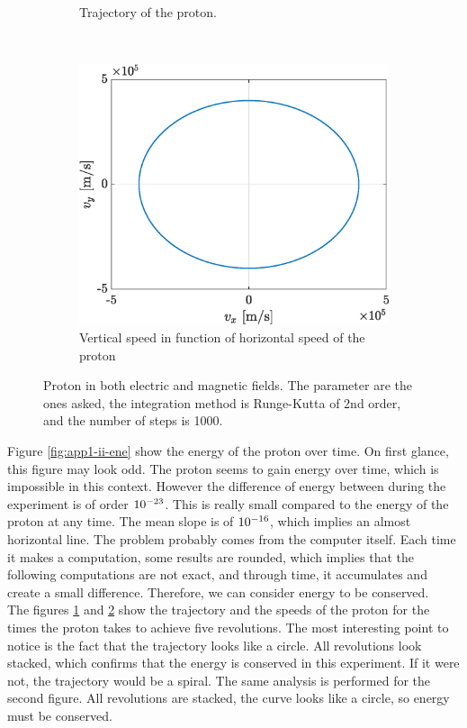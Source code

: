 \documentclass[a4paper,12pt,twoside]{article}
\begin{document}
\begin{figure}[h]
\begin{subfigure}[t]{0.32\textwidth}
	\caption{Trajectory of the proton.}
	\label{fig:app1-ii-traj}
\end{subfigure}
~
\begin{subfigure}[t]{0.32\textwidth}
	\includegraphics[width=\textwidth]{graphs/app1_ii_vit.eps}
	\caption{Vertical speed in function of horizontal speed of the proton}
	\label{fig:app1-ii-vit}
\end{subfigure}
\caption{Proton in both electric and magnetic fields. The parameter are the ones asked, the integration method is Runge-Kutta of 2nd order, and the number of steps is \SI{1000}{}.}
\label{fig:app1_ii}
\end{figure}

Figure \ref{fig:app1-ii-ene} show the energy of the proton over time.
On first glance, this figure may look odd.
The proton seems to gain energy over time, which is impossible in this context.
However the difference of energy between during the experiment is of order $\SI{d-23}{}$.
This is really small compared to the energy of the proton at any time.
The mean slope is of $\SI{d-16}{}$, which implies an almost horizontal line.
The problem probably comes from the computer itself.
Each time it makes a computation, some results are rounded, which implies that the following computations are not exact, and through time, it accumulates and create a small difference.
Therefore, we can consider energy to be conserved.\\

The figures \ref{fig:app1-ii-traj} and \ref{fig:app1-ii-vit} show the trajectory and the speeds of the proton for the times the proton takes to achieve five revolutions.
The most interesting point to notice is the fact that the trajectory looks like a circle.
All revolutions look stacked, which confirms that the energy is conserved in this experiment.
If it were not, the trajectory would be a spiral.
The same analysis is performed for the second figure.
All revolutions are stacked, the curve looks like a circle, so energy must be conserved.\\
\end{document}
